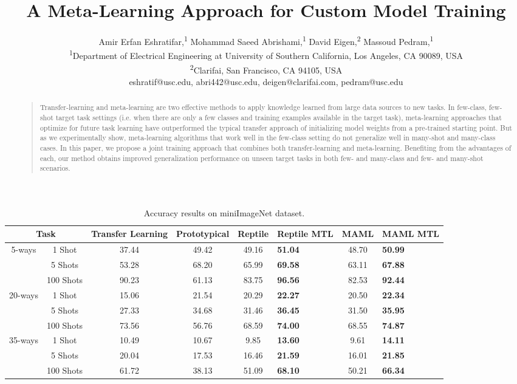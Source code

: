 \documentclass[letterpaper]{article}
\title{A Meta-Learning Approach for Custom Model Training}
\author{Amir Erfan Eshratifar,\textsuperscript{1}
         Mohammad Saeed Abrishami,\textsuperscript{1}
         David Eigen,\textsuperscript{2}
         Massoud Pedram,\textsuperscript{1}\\
\textsuperscript{1}{Department of Electrical Engineering at University of Southern California, Los Angeles, CA 90089, USA}\\
\textsuperscript{2}{Clarifai, San Francisco, CA 94105, USA}\\
eshratif@usc.edu,
abri442@usc.edu, 
deigen@clarifai.com,
pedram@usc.edu}
\begin{document}
\maketitle
\begin{abstract}
\begin{quote}

Transfer-learning and meta-learning are two effective methods to apply knowledge learned from large data sources to new tasks. In few-class, few-shot target task settings (i.e. when there are only a few classes and training examples available in the target task), meta-learning approaches that optimize for future task learning have outperformed the typical transfer approach of initializing model weights from a pre-trained starting point. But as we experimentally show, meta-learning algorithms that work well in the few-class setting do not generalize well in many-shot and many-class cases. In this paper, we propose a joint training approach that combines both transfer-learning and meta-learning. Benefiting from the advantages of each, our method obtains improved generalization performance on unseen target tasks in both few- and many-class and few- and many-shot scenarios.


\end{quote}
\end{abstract}
\begin{table}[ht]
\caption{Accuracy results on miniImageNet dataset.}
  \centering
\label{tab:miniimagenet_results}
\begin{tabular}{c|c|c|c|c|b|c|b}
\multicolumn{2}{c|}{Task}   & Transfer Learning & Prototypical & Reptile & Reptile MTL & MAML & MAML MTL\\
\hline
\multirow{3}{*}{5-ways}  & 1 Shot   &   37.44    & 49.42   & 49.16    & \textbf{51.04}  &   48.70    &  \textbf{50.99}\\
                         & 5 Shots  &   53.28    & 68.20   & 65.99    & \textbf{69.58}  &   63.11   &   \textbf{67.88}\\
                         & 100 Shots &   90.23    & 61.13   & 83.75    & \textbf{96.56}  &   82.53    & \textbf{92.44}\\
\hline
\multirow{3}{*}{20-ways} & 1 Shot   &   15.06    & 21.54   & 20.29    & \textbf{22.27}  &   20.50    & \textbf{22.34}\\
                         & 5 Shots  &   27.33    & 34.68   & 31.46    & \textbf{36.45}  &   31.50    & \textbf{35.95}\\
                         & 100 Shots &   73.56    & 56.76   & 68.59    & \textbf{74.00}  &   68.55    & \textbf{74.87}\\
\hline
\multirow{3}{*}{35-ways} & 1 Shot   &   10.49    & 10.67   & 9.85    & \textbf{13.60}  &   9.61    & \textbf{14.11}\\
                         & 5 Shots  &   20.04    & 17.53   & 16.46    & \textbf{21.59}  &   16.01    & \textbf{21.85} \\
                         & 100 Shots &   61.72    & 38.13   & 51.09    & \textbf{68.10}  &   50.21    & \textbf{66.34}
\end{tabular}
\end{table}
\end{document}
